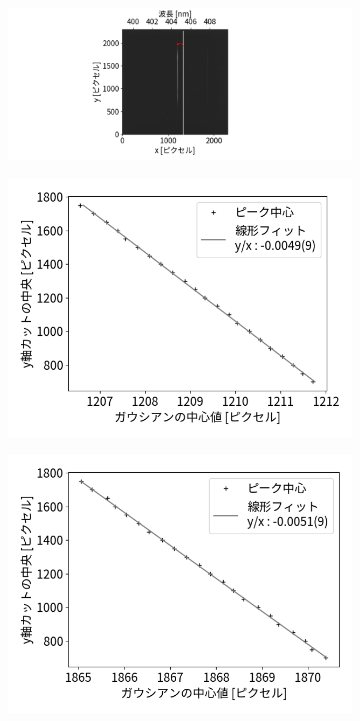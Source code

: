 \documentclass[a4paper,11pt,uplatex]{jsbook}
\begin{document}
\begin{figure}[h]
  \centering
  \begin{subfigure}[h]{\linewidth}
    \centering
    \includegraphics[width=\linewidth]{image/4-tilt.png}
  \end{subfigure}
  \hfill
  \vspace{1em}
  \begin{subfigure}[h]{0.45\linewidth}
    \centering
    \includegraphics[width=\linewidth]{image/4-tiltfpeak.png}
  \end{subfigure}
  \hfill
  \begin{subfigure}[h]{0.45\linewidth}
    \centering
    \includegraphics[width=\linewidth]{image/4-tiltspeak.png}

\end{subfigure}
\end{figure}
\end{document}
